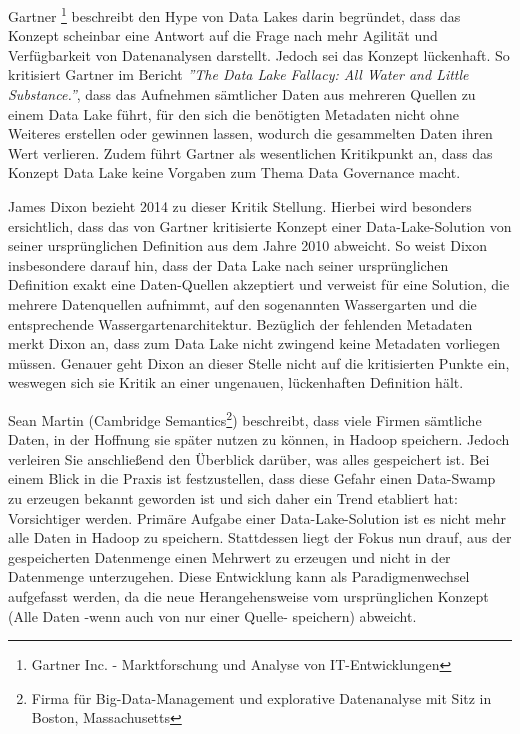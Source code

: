 \documentclass[twoside,twocolumn]{article}
\begin{document}
Gartner \footnote{Gartner Inc. - Marktforschung und Analyse von IT-Entwicklungen} beschreibt den Hype von Data Lakes darin begründet, dass das Konzept scheinbar eine Antwort auf die Frage nach mehr Agilität und Verfügbarkeit von Datenanalysen darstellt. Jedoch sei das Konzept lückenhaft. So kritisiert Gartner im Bericht \textit{''The Data Lake Fallacy: All Water and Little Substance.''}, dass das Aufnehmen sämtlicher Daten aus mehreren Quellen zu einem Data Lake führt, für den sich die benötigten Metadaten nicht ohne Weiteres erstellen oder gewinnen lassen, wodurch die gesammelten Daten ihren Wert verlieren. Zudem führt Gartner als wesentlichen Kritikpunkt an, dass das Konzept Data Lake keine Vorgaben zum Thema Data Governance macht.\cite{src3}

James Dixon bezieht 2014 zu dieser Kritik Stellung. Hierbei wird besonders ersichtlich, dass das von Gartner kritisierte Konzept einer Data-Lake-Solution von seiner ursprünglichen Definition aus dem Jahre 2010 abweicht. \cite{src14} So weist Dixon insbesondere darauf hin, dass der Data Lake nach seiner ursprünglichen Definition exakt eine Daten-Quellen akzeptiert und verweist für eine Solution, die mehrere Datenquellen aufnimmt, auf den sogenannten Wassergarten und die entsprechende Wassergartenarchitektur.\cite{src15} Bezüglich der fehlenden Metadaten merkt Dixon an, dass zum Data Lake nicht zwingend keine Metadaten vorliegen müssen. Genauer geht Dixon an dieser Stelle nicht auf die kritisierten Punkte ein, weswegen sich sie Kritik an einer ungenauen, lückenhaften Definition hält.

Sean Martin (Cambridge Semantics\footnote{Firma für Big-Data-Management und explorative Datenanalyse mit Sitz in Boston, Massachusetts}) beschreibt, dass viele Firmen sämtliche Daten, in der Hoffnung sie später nutzen zu können, in Hadoop speichern. Jedoch verleiren Sie anschließend den Überblick darüber, was alles gespeichert ist.
Bei einem Blick in die Praxis ist festzustellen, dass diese Gefahr einen Data-Swamp zu erzeugen bekannt geworden ist und sich daher ein Trend etabliert hat: Vorsichtiger werden. Primäre Aufgabe einer Data-Lake-Solution ist es nicht mehr alle Daten in Hadoop zu speichern. Stattdessen liegt der Fokus nun drauf, aus der gespeicherten Datenmenge einen Mehrwert zu erzeugen und nicht in der Datenmenge unterzugehen. \cite{src1} Diese Entwicklung kann als Paradigmenwechsel aufgefasst werden, da die neue Herangehensweise vom ursprünglichen Konzept (Alle Daten -wenn auch von nur einer Quelle- speichern) abweicht.
\end{document}
